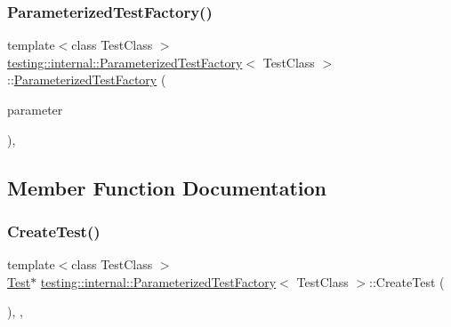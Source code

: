 \subsubsection{\texorpdfstring{Parameterized\+Test\+Factory()}{ParameterizedTestFactory()}}
{\footnotesize\ttfamily template$<$class Test\+Class $>$ \\
\hyperlink{classtesting_1_1internal_1_1ParameterizedTestFactory}{testing\+::internal\+::\+Parameterized\+Test\+Factory}$<$ Test\+Class $>$\+::\hyperlink{classtesting_1_1internal_1_1ParameterizedTestFactory}{Parameterized\+Test\+Factory} (\begin{DoxyParamCaption}\item[{\hyperlink{classtesting_1_1internal_1_1ParameterizedTestFactory_ad9a27b8e1a83de2f1687625bccff460d}{Param\+Type}}]{parameter }\end{DoxyParamCaption})\hspace{0.3cm}{\ttfamily [inline]}, {\ttfamily [explicit]}}



\subsection{Member Function Documentation}
\mbox{\label{classtesting_1_1internal_1_1ParameterizedTestFactory_a36d962674d7bf845398637338b9f75cb}} 
\subsubsection{\texorpdfstring{Create\+Test()}{CreateTest()}}
{\footnotesize\ttfamily template$<$class Test\+Class $>$ \\
\hyperlink{classtesting_1_1Test}{Test}$\ast$ \hyperlink{classtesting_1_1internal_1_1ParameterizedTestFactory}{testing\+::internal\+::\+Parameterized\+Test\+Factory}$<$ Test\+Class $>$\+::Create\+Test (\begin{DoxyParamCaption}{ }\end{DoxyParamCaption})\hspace{0.3cm}{\ttfamily [inline]}, {\ttfamily [override]}, {\ttfamily [virtual]}}




